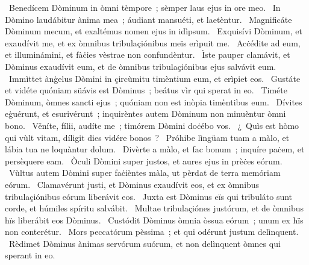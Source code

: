 ~Benedícem Dòminum in òmni tèmpore~; sèmper laus ejus in ore meo. 
~In Dòmino laudábitur ànima mea~; áudiant mansuéti, et laetèntur. 
~Magnificáte Dòminum mecum, et exaltémus nomen ejus in idìpsum. 
~Exquisívi Dòminum, et exaudívit me, et ex òmnibus tribulaçiónibus meïs erìpuit me. 
~Acċédite ad eum, et illuminámini, et fàċies vèstrae non confundèntur. 
~Ìste pauper clamávit, et Dòminus exaudívit eum, et de òmnibus tribulaçiónibus ejus salvávit eum. 
~Immìttet ànġelus Dòmini in çircùmitu timèntium eum, et erìpiet eos. 
~Gustáte et vidéte quóniam süávis est Dòminus~; beátus vìr qui sperat in eo. 
~Timéte Dòminum, òmnes sancti ejus~; quóniam non est inòpia timèntibus eum. 
~Dívites eġuérunt, et esurivérunt~; inquirèntes autem Dòminum non minuèntur òmni bono. 
~Věníte, fílii, audíte me~; timórem Dòmini doċébo vos. 
~¿~Quìs est hòmo qui vùlt vitam, díligit dies vidére bonos~? 
~Próhibe lìngüam tuam a màlo, et lábia tua ne loquàntur dolum. 
~Divèrte a màlo, et fac bonum~; inquíre paċem, et persèquere eam. 
~Òculi Dòmini super justos, et aures ejus in prèċes eórum. 
~Vùltus autem Dòmini super faċièntes màla, ut pèrdat de terra memóriam eórum. 
~Clamavérunt justi, et Dòminus exaudívit eos, et ex òmnibus tribulaçiónibus eórum liberávit eos. 
~Juxta est Dòminus eïs qui tribuláto sunt corde, et húmiles spíritu salvábit. 
~Multae tribulaçiónes justórum, et de òmnibus hïs liberábit eos Dòminus. 
~Custódit Dòminus òmnia òssua eórum~; unum ex hïs non conterétur. 
~Mors peccatórum pèssima~; et qui odérunt justum delìnquent. 
~Rèdimet Dòminus ànimas servórum suórum, et non delìnquent òmnes qui sperant in eo. 
